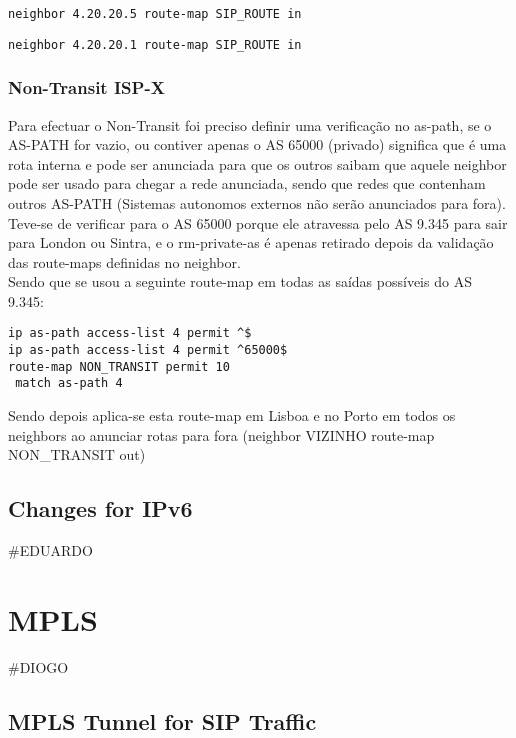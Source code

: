 \documentclass[11pt,a4paper]{report}
\begin{document}
\begin{lstlisting}[caption=Cancelar rota para NetS1 recebida em Lisboa por London]
neighbor 4.20.20.5 route-map SIP_ROUTE in
\end{lstlisting}

\begin{lstlisting}[caption=Cancelar rota para NetS1 recebida no Porto por London]
neighbor 4.20.20.1 route-map SIP_ROUTE in
\end{lstlisting}

\subsection{Non-Transit ISP-X}

Para efectuar o Non-Transit foi preciso definir uma verificação no as-path, se o AS-PATH for vazio, ou contiver apenas o AS 65000 (privado) significa que é uma rota interna e pode ser anunciada para que os outros saibam que aquele neighbor pode ser usado para chegar a rede anunciada, sendo que redes que contenham outros AS-PATH (Sistemas autonomos externos não serão anunciados para fora).\\

Teve-se de verificar para o AS 65000 porque ele atravessa pelo AS 9.345 para sair para London ou Sintra, e o rm-private-as é apenas retirado depois da validação das route-maps definidas no neighbor.\\

Sendo que se usou a seguinte route-map em todas as saídas possíveis do AS 9.345:

\begin{lstlisting}[caption=Tornar ISP X num AS Non-Transit]
ip as-path access-list 4 permit ^$
ip as-path access-list 4 permit ^65000$
route-map NON_TRANSIT permit 10
 match as-path 4
\end{lstlisting}

Sendo depois aplica-se esta route-map em Lisboa e no Porto em todos os neighbors ao anunciar rotas para fora (neighbor VIZINHO route-map NON\_TRANSIT out)

\section{Changes for IPv6}
\#EDUARDO

\chapter{MPLS}
\#DIOGO
\section{MPLS Tunnel for SIP Traffic}
\end{document}
